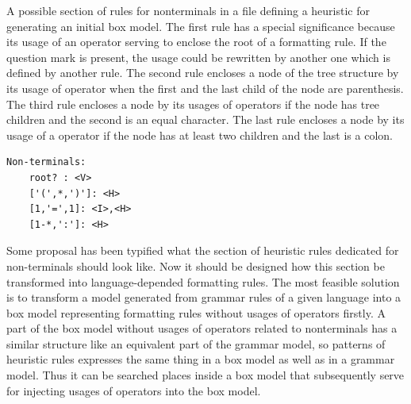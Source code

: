 \documentclass[12pt,notitlepage,a4paper]{report}
\begin{document}
\begin{expl}\label{HeuristicNonterms}
A possible section of  rules for nonterminals in a file defining a heuristic for generating an initial box model. The first rule has a special significance because its usage of an operator serving to enclose the root of a formatting rule. If the question mark is present, the usage could be rewritten by another one which is defined by another rule. The second rule encloses a node of the tree structure by its usage of operator when the first and the last child of the node are parenthesis. The third rule encloses a node  by its usages of operators if the node has tree children and the second is an equal character. The last rule encloses a node by its usage of a operator if the node has at least two children and the last is a colon.
\begingroup
\fontsize{10pt}{12pt}
\begin{Verbatim}[commandchars=\\\{\}]
Non-terminals:
    root? : <V>
    ['(',*,')']: <H>
    [1,'=',1]: <I>,<H>
    [1-*,':']: <H>
\end{Verbatim}
\endgroup
\end{expl}

Some proposal has been typified what the section of heuristic rules dedicated for non-terminals should look like. Now it should be designed how this section be transformed into language-depended formatting rules. The most feasible solution is to transform a model generated from grammar rules of a given language into a box model representing formatting rules without usages of operators firstly. A part of the box model without usages of operators related to nonterminals  has a similar structure like an equivalent part of the grammar model, so patterns of heuristic rules expresses the same thing in a box model as well as in a grammar model. Thus it can be searched places inside a box model that subsequently serve for injecting usages of operators into the box model. 
\end{document}
